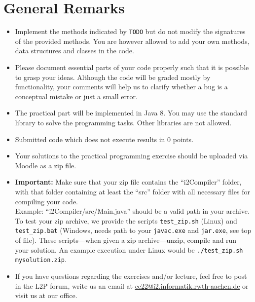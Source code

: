 \documentclass[a4paper]{article}
\begin{document}

\section*{General Remarks}
\begin{itemize}
  \item Implement the methods indicated by \texttt{TODO} but do not modify the signatures of the provided methods. You are however allowed to add your own methods, data structures and classes in the code.
  \item Please document essential parts of your code properly such that it is possible to grasp your ideas. Although the code will be graded mostly by functionality, your comments will help us to clarify whether a bug is a conceptual mistake or just a small error.
  \item The practical part will be implemented in Java 8. You may use the standard library to solve the programming tasks. Other libraries are not allowed.
  \item Submitted code which does not execute results in 0 points.
  \item Your solutions to the practical programming exercise should be uploaded via Moodle as a zip file.
  \item \textbf{Important:} Make sure that your zip file contains the ``i2Compiler'' folder, with that folder containing at least the ``src'' folder with all necessary files for compiling your code.\\
    Example: ``i2Compiler/src/Main.java'' should be a valid path in your archive.\\
    To test your zip archive, we provide the scripts \texttt{test\_zip.sh} (Linux) and \texttt{test\_zip.bat} (Windows, needs path to your \texttt{javac.exe} and \texttt{jar.exe}, see top of file).
    These scripts---when given a zip archive---unzip, compile and run your solution.
    An example execution under Linux would be \texttt{./test\_zip.sh mysolution.zip}.
  \item If you have questions regarding the exercises and/or lecture, feel free to post in the L2P forum, write us an email at \href{mailto:cc22@i2.informatik.rwth-aachen.de}{cc22@i2.informatik.rwth-aachen.de} or visit us at our office.
\end{itemize}
\end{document}
